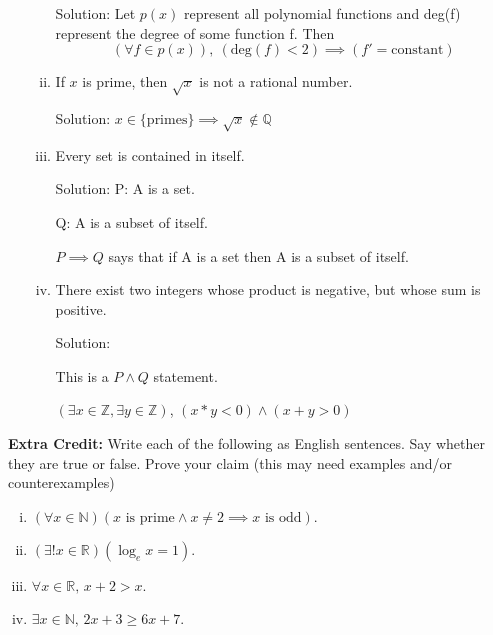 \documentclass[11pt]{amsart}
\newcommand{\Q}{\mathbb{Q}}
\newcommand{\Z}{\mathbb{Z}}
\begin{document}
\begin{enumerate}
\begin{enumerate}[(i)]
Solution: Let $p(x)$ represent all polynomial functions and deg(f) represent the degree of some function f. Then $$(\forall f \in p(x)), \ (\text{deg}(f) < 2) \implies (f' = \text{constant})$$


\item If $x$ is prime, then $\sqrt{x}$ is not a rational number.

Solution: $x \in \lbrace \text{primes} \rbrace \implies \sqrt{x} \notin \Q$


\item Every set is contained in itself.

Solution: P: A is a set.

Q: A is a subset of itself.

$P \implies Q$ says that if A is a set then A is a subset of itself.


\item There exist two integers whose product is negative, but whose sum is positive.

Solution: 

This is a $ P \wedge Q $ statement.

$(\exists x \in \Z,  \exists y \in \Z)$, $(x*y < 0) \wedge (x + y > 0)$


\end{enumerate}
\end{enumerate}


\underline{\hspace{6in}}
\vspace{.5in}

\noindent \textbf{Extra Credit:}  Write each of the following as English sentences. Say whether they are true or false. Prove your claim (this may need examples and/or counterexamples)
\begin{enumerate}[(i)]
\item $(\forall x\in\mathbb{N})(x \text{ is prime}\wedge x\ne 2\implies x \text{ is odd}).$
\item $(\exists! x\in\mathbb{R})( \log_e{x} = 1).$ 
\item $\forall x\in\mathbb{R},\,x+2>x$.
\item $\exists x\in\mathbb{N},\, 2x+3\geq6x+7$.
\end{enumerate}
\end{document}

